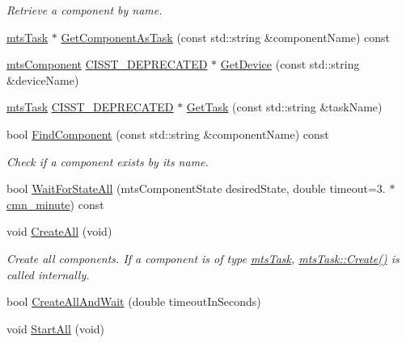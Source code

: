 \begin{DoxyCompactItemize}
\begin{DoxyCompactList}\small\item\em Retrieve a component by name. \end{DoxyCompactList}\item 
\hyperlink{classmts_task}{mts\+Task} $\ast$ \hyperlink{classmts_manager_local_abcc591187a95da4dfddcdc70f340e2c1}{Get\+Component\+As\+Task} (const std\+::string \&component\+Name) const 
\item 
\hyperlink{classmts_component}{mts\+Component} \hyperlink{cmn_portability_8h_a63da7164735f9501be651b1f2bbc0121}{C\+I\+S\+S\+T\+\_\+\+D\+E\+P\+R\+E\+C\+A\+T\+E\+D} $\ast$ \hyperlink{classmts_manager_local_a8bc0276a100b36b06f5088a7f0d04240}{Get\+Device} (const std\+::string \&device\+Name)
\item 
\hyperlink{classmts_task}{mts\+Task} \hyperlink{cmn_portability_8h_a63da7164735f9501be651b1f2bbc0121}{C\+I\+S\+S\+T\+\_\+\+D\+E\+P\+R\+E\+C\+A\+T\+E\+D} $\ast$ \hyperlink{classmts_manager_local_ac128c1f6173b6d4dbe6002106103c5bb}{Get\+Task} (const std\+::string \&task\+Name)
\item 
bool \hyperlink{classmts_manager_local_afc2ea63402479809aa1c72609b8d52b9}{Find\+Component} (const std\+::string \&component\+Name) const 
\begin{DoxyCompactList}\small\item\em Check if a component exists by its name. \end{DoxyCompactList}\item 
bool \hyperlink{classmts_manager_local_a0ae805235f0e479c0c150d7a0999a1e0}{Wait\+For\+State\+All} (mts\+Component\+State desired\+State, double timeout=3. $\ast$\hyperlink{cmn_units_8h_a212c64aa2bb4e6ff3d78943569e1b58c}{cmn\+\_\+minute}) const 
\item 
void \hyperlink{classmts_manager_local_a5266feade3df21c28176d03048d8178d}{Create\+All} (void)
\begin{DoxyCompactList}\small\item\em Create all components. If a component is of type \hyperlink{classmts_task}{mts\+Task}, \hyperlink{classmts_task_abc1a625d025c1038fa48137f0ba53465}{mts\+Task\+::\+Create()} is called internally. \end{DoxyCompactList}\item 
bool \hyperlink{classmts_manager_local_a8bfe1cff79e11fa60a2354a3b5ac279b}{Create\+All\+And\+Wait} (double timeout\+In\+Seconds)
\item 
void \hyperlink{classmts_manager_local_a2c7b41b02521fa73490b70c575c3803b}{Start\+All} (void)

\end{DoxyCompactItemize}
